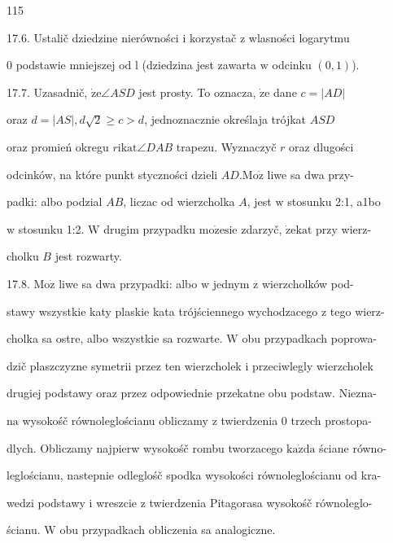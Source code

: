 \documentclass[a4paper,12pt]{article}
\begin{document}
115

17.6. Ustalič dziedzine nierówności $\mathrm{i}$ korzystač $\mathrm{z}$ wlasności logarytmu

$0$ podstawie mniejszej od l (dziedzina jest zawarta $\mathrm{w}$ odcinku $(0,1)$).

17.7. Uzasadnič, $\dot{\mathrm{z}}\mathrm{e} \angle ASD$ jest prosty. To oznacza, $\dot{\mathrm{z}}\mathrm{e}$ dane $c= |AD|$

oraz $d = |AS|, d\sqrt{2} \geq c > d$, jednoznacznie określaja trójkat $ASD$

oraz promień okregu $r \mathrm{i}\mathrm{k}\mathrm{a}\mathrm{t} \angle DAB$ trapezu. Wyznaczyč $r$ oraz dlugości

odcinków, na które punkt styczności dzieli $AD. \mathrm{M}\mathrm{o}\dot{\mathrm{z}}$ liwe sa dwa przy-

padki: albo podzial $AB$, liczac od wierzcholka $A$, jest $\mathrm{w}$ stosunku 2:1, a1bo

$\mathrm{w}$ stosunku 1:2. $\mathrm{W}$ drugim przypadku $\mathrm{m}\mathrm{o}\dot{\mathrm{z}}\mathrm{e}\mathrm{s}\mathrm{i}\mathrm{e}$ zdarzyč, $\dot{\mathrm{z}}\mathrm{e}\mathrm{k}\mathrm{a}\mathrm{t}$ przy wierz-

cholku $B$ jest rozwarty.

17.8. $\mathrm{M}\mathrm{o}\dot{\mathrm{z}}$ liwe sa dwa przypadki: albo $\mathrm{w}$ jednym $\mathrm{z}$ wierzcholków pod-

stawy wszystkie katy plaskie kata trójściennego wychodzacego $\mathrm{z}$ tego wierz-

cholka sa ostre, albo wszystkie sa rozwarte. $\mathrm{W}$ obu przypadkach poprowa-

dzič plaszczyzne symetrii przez ten wierzcholek $\mathrm{i}$ przeciwlegly wierzcholek

drugiej podstawy oraz przez odpowiednie przekatne obu podstaw. Niezna-

$\mathrm{n}\mathrm{a}$ wysokośč równoleglościanu obliczamy $\mathrm{z}$ twierdzenia $0$ trzech prostopa-

dlych. Obliczamy najpierw wysokośč rombu tworzacego $\mathrm{k}\mathrm{a}\dot{\mathrm{z}}\mathrm{d}\mathrm{a}$ ściane równo-

leglościanu, nastepnie odleglośč spodka wysokości równoleglościanu od kra-

wedzi podstawy $\mathrm{i}$ wreszcie $\mathrm{z}$ twierdzenia Pitagorasa wysokośč równoleglo-

ścianu. $\mathrm{W}$ obu przypadkach obliczenia sa analogiczne.
\end{document}
